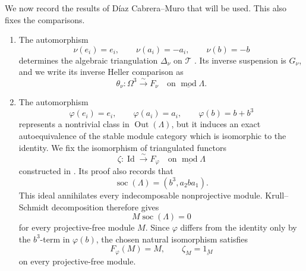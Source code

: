 \documentclass[a4paper,11pt,reqno]{amsart}
\theoremstyle{definition}
\theoremstyle{plain}
\numberwithin{equation}{section}
\newcommand{\T}{\mathcal T}
\begin{document}
We now record the results of D\'iaz Cabrera--Muro that will be used.  This
also fixes the comparisons.

\begin{enumerate}[label=\textup{(\roman*)},leftmargin=2.1em]
\item The automorphism
\begin{equation}
\label{eq:L2-nu}
 \nu(e_i)=e_i,
 \qquad
 \nu(a_i)=-a_i,
 \qquad
 \nu(b)=-b
\end{equation}
determines the algebraic triangulation \(\Delta_\nu\) on \(\T\)
\cite[Theorem~2.6 and (3.2)]{DiazCabreraMuro2026}.  Its
inverse suspension is \(G_\nu\), and we write its inverse Heller
comparison as
\begin{equation}
\label{eq:L2-algebraic-heller}
 \theta_\nu:\Omega^3\xrightarrow{\sim}F_\nu
 \quad\text{on }\underline{\operatorname{mod}}\Lambda.
\end{equation}

\item The automorphism
\begin{equation}
\label{eq:L2-phi}
 \varphi(e_i)=e_i,
 \qquad
 \varphi(a_i)=a_i,
 \qquad
 \varphi(b)=b+b^3
\end{equation}
represents a nontrivial class in \(\operatorname{Out}(\Lambda)\), but it
induces an exact autoequivalence of the stable module category which is
isomorphic to the identity.  We fix the isomorphism of triangulated functors
\begin{equation}
\label{eq:L2-stable-zeta}
 \zeta:\operatorname{Id}\xrightarrow{\sim}F_\varphi
 \quad\text{on }\underline{\operatorname{mod}}\Lambda
\end{equation}
constructed in \cite[Proposition~3.4]{DiazCabreraMuro2026}.  Its proof
also records that
\begin{equation}
\label{eq:L2-socle}
 \operatorname{soc}(\Lambda)=(b^3,a_2ba_1).
\end{equation}
This ideal annihilates every indecomposable nonprojective module.
Krull--Schmidt decomposition therefore gives
\begin{equation}
\label{eq:L2-socle-annihilation}
 M\operatorname{soc}(\Lambda)=0
\end{equation}
for every projective-free module \(M\).  Since \(\varphi\) differs from
the identity only by the \(b^3\)-term in \(\varphi(b)\), the chosen
natural isomorphism satisfies
\begin{equation}
\label{eq:L2-zeta-on-projective-free}
 F_\varphi(M)=M,
 \qquad
 \zeta_M=\underline{1_M}
\end{equation}
on every projective-free module.


\end{enumerate}
\end{document}
